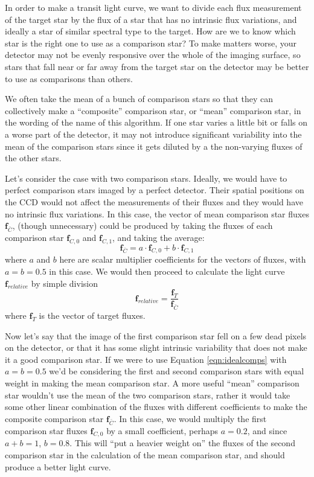 \documentclass[a4paper]{article}
\begin{document}
In order to make a transit light curve, we want to divide each flux measurement of the target star by the flux of a star that has no intrinsic flux variations, and ideally a star of similar spectral type to the target. How are we to know which star is the right one to use as a comparison star? To make matters worse, your detector may not be evenly responsive over the whole of the imaging surface, so stars that fall near or far away from the target star on the detector may be better to use as comparisons than others. 

We often take the mean of a bunch of comparison stars so that they can collectively make a ``composite'' comparison star, or ``mean'' comparison star, in the wording of the name of this algorithm. If one star varies a little bit or falls on a worse part of the detector, it may not introduce significant variability into the mean of the comparison stars since it gets diluted by a the non-varying fluxes of the other stars. 

Let's consider the case with two comparison stars. Ideally, we would have to perfect comparison stars imaged by a perfect detector. Their spatial positions on the CCD would not affect the measurements of their fluxes and they would have no intrinsic flux variations. In this case, the vector of mean comparison star fluxes $\mathbf{f}_{\bar{C}}$, (though unnecessary) could be produced by taking the fluxes of each comparison star $\mathbf{f}_{C,0}$ and $\mathbf{f}_{C,1}$, and taking the average: 
\begin{equation} \label{eqn:idealcomps}
\mathbf{f}_{\bar{C}} = a \cdot \mathbf{f}_{C,0}  + b \cdot \mathbf{f}_{C,1}
\end{equation}
where $a$ and $b$ here are scalar multiplier coefficients for the vectors of fluxes, with $a = b = 0.5$ in this case. We would then proceed to calculate the light curve $\mathbf{f}_{relative}$ by simple division
\begin{equation}
\mathbf{f}_{relative}  = \frac{\mathbf{f}_{T}}{\mathbf{f}_{\bar{C}}}
\end{equation}
where $\mathbf{f}_{T}$ is the vector of target fluxes. 

Now let's say that the image of the first comparison star fell on a few dead pixels on the detector, or that it has some slight intrinsic variability that does not make it a good comparison star. If we were to use Equation \ref{eqn:idealcomps} with $a = b = 0.5$ we'd be considering the first and second comparison stars with equal weight in making the mean comparison star. A more useful ``mean'' comparison star wouldn't use the mean of the two comparison stars, rather it would take some other linear combination of the fluxes with different coefficients to make the composite comparison star $\mathbf{f}_{\bar{C}}$. In this case, we would multiply the first comparison star fluxes $\mathbf{f}_{C,0}$ by a small coefficient, perhaps $a = 0.2$, and since $a + b = 1$, $b=0.8$. This will ``put a heavier weight on'' the fluxes of the second comparison star in the calculation of the mean comparison star, and should produce a better light curve. 
\end{document}
